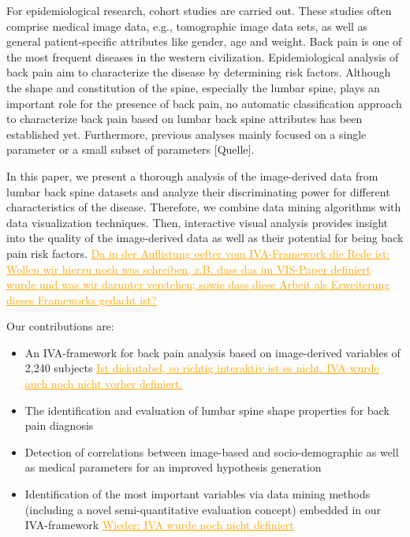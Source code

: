 \documentclass[a4paper,twoside]{style/article}
\newcommand{\com}[1]{\textcolor{orange}{\uline{#1}}}
\begin{document}
For epidemiological research, cohort studies are carried out.
These studies often comprise medical image data, e.g., tomographic image data sets, as well as general patient-specific attributes like gender, age and weight.
Back pain is one of the most frequent diseases in the western civilization. 
Epidemiological analysis of back pain aim to characterize the disease by determining risk factors.
Although the shape and constitution of the spine, especially the lumbar spine, plays an important role for the presence of back pain, no automatic classification approach to characterize back pain based on lumbar back spine attributes has been established yet.
Furthermore, previous analyses mainly focused on a single parameter or a small subset of parameters [Quelle].

In this paper, we present a thorough analysis of the image-derived data from lumbar back spine datasets and analyze their discriminating power for different characteristics of the disease.
Therefore, we combine data mining algorithms with data visualization techniques.
Then, interactive visual analysis provides insight into the quality of the image-derived data as well as their potential for being back pain risk factors.
\com{Da in der Auflistung oefter vom IVA-Framework die Rede ist: Wollen wir hierzu noch was schreiben, z.B. dass das im VIS-Paper definiert wurde und was wir darunter verstehen; sowie dass diese Arbeit als Erweiterung dieses Frameworks gedacht ist?}

Our contributions are:
\begin{itemize}
\item An IVA-framework for back pain analysis based on image-derived variables of 2,240 subjects \com{Ist diskutabel, so richtig interaktiv ist es nicht. IVA wurde auch noch nicht vorher definiert.}
\item The identification and evaluation of lumbar spine shape properties for back pain diagnosis
\item Detection of correlations between image-based and socio-demographic as well as medical parameters for an improved hypothesis generation
\item Identification of the most important variables via data mining methods (including a novel semi-quantitative evaluation concept) embedded in our IVA-framework \com{Wieder: IVA wurde noch nicht definiert}
\end{itemize}
\end{document}
